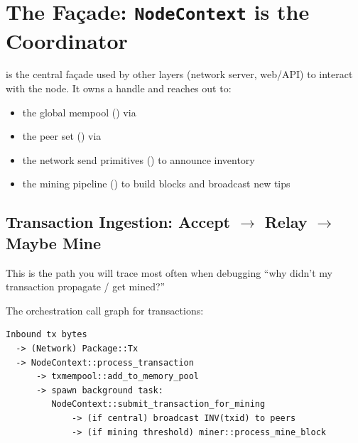 \section{The Façade: \texttt{NodeContext} is the Coordinator}
\label{sec:ch13-facade}

 is the central façade used by other layers (network server, web/API) to interact with the node. It owns a  handle and reaches out to:

\begin{itemize}
  \item the global mempool () via 
  \item the peer set () via 
  \item the network send primitives () to announce inventory
  \item the mining pipeline () to build blocks and broadcast new tips
\end{itemize}

\subsection{Transaction Ingestion: Accept $\to$ Relay $\to$ Maybe Mine}
\label{sec:ch13-transaction-ingestion}

This is the path you will trace most often when debugging ``why didn't my transaction propagate / get mined?''

The orchestration call graph for transactions:

\begin{verbatim}
Inbound tx bytes
  -> (Network) Package::Tx
  -> NodeContext::process_transaction
      -> txmempool::add_to_memory_pool
      -> spawn background task:
         NodeContext::submit_transaction_for_mining
             -> (if central) broadcast INV(txid) to peers
             -> (if mining threshold) miner::process_mine_block
\end{verbatim}

